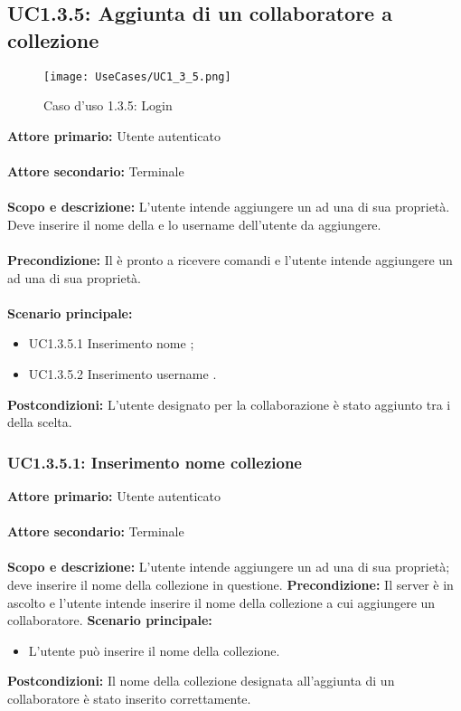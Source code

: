 \documentclass{scalatekids-article}
\begin{document}
\subsection{UC1.3.5: Aggiunta di un collaboratore a collezione}

\begin{figure}[H]
  \begin{center}
    \texttt{[image: UseCases/UC1\_3\_5.png]}
    \caption*{Caso d'uso 1.3.5: Login}
  \end{center}
\end{figure}
\textbf{Attore primario:} Utente autenticato\\ \\
\textbf{Attore secondario:} Terminale\\ \\
\textbf{Scopo e descrizione:} L'utente intende aggiungere un  ad una  di sua proprietà. Deve inserire il nome della  e lo username dell'utente da aggiungere.\\ \\
\textbf{Precondizione:} Il  è pronto a ricevere comandi e l'utente intende aggiungere un  ad una  di sua proprietà.\\ \\
\textbf{Scenario principale:}
\begin{itemize}
\item UC1.3.5.1 Inserimento nome ;
\item UC1.3.5.2 Inserimento username .
\end{itemize}
\textbf{Postcondizioni:} L'utente designato per la collaborazione è stato aggiunto tra i  della  scelta.

\subsubsection{UC1.3.5.1: Inserimento nome collezione}

\textbf{Attore primario:} Utente autenticato\\ \\
\textbf{Attore secondario:} Terminale\\ \\
\textbf{Scopo e descrizione:} L'utente intende aggiungere un  ad una  di sua proprietà; deve inserire il nome della collezione in questione.
\textbf{Precondizione:} Il server è in ascolto e l'utente intende inserire il nome della collezione a cui aggiungere un collaboratore.
\textbf{Scenario principale:}
\begin{itemize}
\item L'utente può inserire il nome della collezione.
\end{itemize}
\textbf{Postcondizioni:} Il nome della collezione designata all'aggiunta di un collaboratore è stato inserito correttamente.
\end{document}
